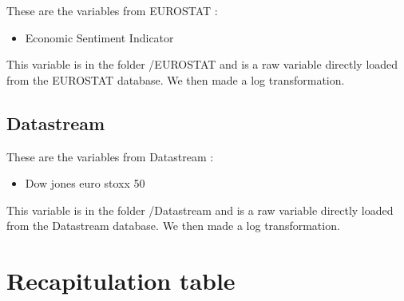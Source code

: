 \documentclass[11pt,a4paper]{article}
\begin{document}
These are the variables from EUROSTAT :
\begin{itemize}
\item Economic Sentiment Indicator
\end{itemize}

\vspace{0.5cm}

This variable is in the folder /EUROSTAT and is a raw variable directly loaded from the EUROSTAT database. We then made a log transformation. 

\subsection{Datastream}

These are the variables from Datastream :
\begin{itemize}
\item Dow jones euro stoxx 50
\end{itemize}

\vspace{0.5cm}

This variable is in the folder /Datastream and is a raw variable directly loaded from the Datastream database. We then made a log transformation. 




\section{Recapitulation table}
\end{document}
